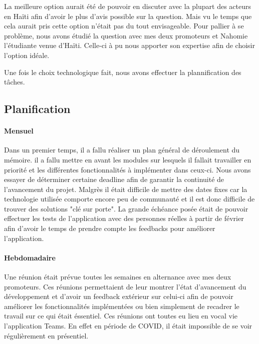 \documentclass{EPL-master-thesis-covers-FR}
\begin{document}
			La meilleure option aurait été de pouvoir en discuter avec la plupart des acteurs en Haïti afin d'avoir le plus d'avis possible sur la question. Mais vu le temps que cela aurait pris cette option n'était pas du tout envisageable. Pour pallier à se problème, nous avons étudié la question avec mes deux promoteurs et Nahomie l'étudiante venue d'Haïti. Celle-ci à pu nous apporter son expertise afin de choisir l'option idéale.
			
			Une fois le choix technologique fait, nous avons effectuer la plannification des tâches.
		
		


			\subsection*{Planification}
				\label{sec:planification}
				
				\paragraph*{Mensuel}
				Dans un premier temps, il a fallu réaliser un plan général de déroulement du mémoire. il a fallu mettre en avant les modules sur lesquels il fallait travailler en priorité et les différentes fonctionnalités à implémenter dans ceux-ci.   Nous avons essayer de déterminer certaine deadline afin de garantir la continuité de l'avancement du projet. Malgrès il était difficile de mettre des dates fixes car la technologie utilisée comporte encore peu de communauté et il est donc difficile de trouver des solutions "clé sur porte". 
				La grande échéance posée était de pouvoir effectuer les tests de l'application avec des personnes réelles à partir de février afin d'avoir le temps de prendre compte les feedbacks pour améliorer l'application.
				
				\paragraph*{Hebdomadaire} 
				Une réunion était prévue toutes les semaines en alternance avec mes deux promoteurs. Ces réunions permettaient de leur montrer l'état d'avancement du développement et d'avoir un feedback extérieur sur celui-ci afin de pouvoir améliorer les fonctionnalités implémentées ou bien simplement de recadrer le travail sur ce qui était éssentiel. 
				Ces réunions ont toutes eu lieu en vocal vie l'application Teams. En effet en période de COVID, il était impossible de se voir régulièrement en présentiel.
				
\end{document}
